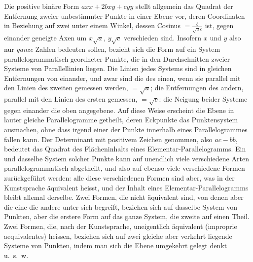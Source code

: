 Die positive binäre Form $axx+2bxy+cyy$ stellt allgemein das Quadrat der Entfernung zweier unbestimmter Punkte in einer Ebene vor, deren Coordinaten in Beziehung auf zwei unter einem Winkel, dessen Cosinus $=\frac{b}{\surd ac}$ ist, gegen einander geneigte Axen um $x\surd a$, $y\surd c$ verschieden sind. Insofern $x$ und $y$ also nur \emph{ganze} Zahlen bedeuten sollen, bezieht sich die Form auf ein System parallelogrammatisch geordneter Punkte, die in den Durchschnitten zweier Systeme von Parallellinien liegen. Die Linien jedes Systems sind in gleichen Entfernungen von einander, und zwar sind die des einen, wenn sie parallel mit den Linien des zweiten gemessen werden, $=\surd a$; die Entfernungen des andern, parallel mit den Linien des ersten gemessen, $=\surd c$: die Neigung beider Systeme gegen einander die oben angegebene. Auf diese Weise erscheint die Ebene in lauter gleiche Parallelogramme getheilt, deren Eckpunkte das Punktensystem ausmachen, ohne dass irgend einer der Punkte innerhalb eines Parallelogrammes fallen kann. Der Determinant mit positivem Zeichen genommen, also $ac-bb$, bedeutet das Quadrat des Flächeninhalts eines Elementar-Parallelogramms. Ein und dasselbe System solcher Punkte kann auf unendlich viele verschiedene Arten parallelogrammatisch abgetheilt, und also auf ebenso viele verschiedene Formen zurückgeführt werden: alle diese verschiedenen Formen sind aber, was in der Kunstsprache äquivalent heisst, und der Inhalt eines Elementar-Parallelogramms bleibt allemal derselbe. Zwei Formen, die nicht äquivalent sind, von denen aber die eine die andere unter sich begreift, beziehen sich auf dasselbe System von Punkten, aber die erstere Form auf das ganze System, die zweite auf einen Theil. Zwei Formen, die, nach der Kunstsprache, uneigentlich äquivalent (improprie aequivalentes) heissen, beziehen sich auf zwei gleiche aber verkehrt liegende Systeme von Punkten, indem man sich die Ebene umgekehrt gelegt denkt u.~s.~w.

